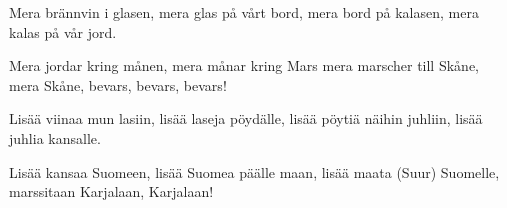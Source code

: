\medskip

\begin{guitar}
	Mera brännvin i glasen,
	mera glas på vårt bord,
	mera bord på kalasen,
	mera kalas på vår jord.

	Mera jordar kring månen,
	mera månar kring Mars
	mera marscher till Skåne,
	mera Skåne, bevars, bevars, bevars!

	\smallskip

	Lisää viinaa mun lasiin,
	lisää laseja pöydälle,
	lisää pöytiä näihin juhliin,
	lisää juhlia kansalle.

	Lisää kansaa Suomeen,
	lisää Suomea päälle maan,
	lisää maata (Suur) Suomelle,
	marssitaan Karjalaan, Karjalaan!
\end{guitar}
